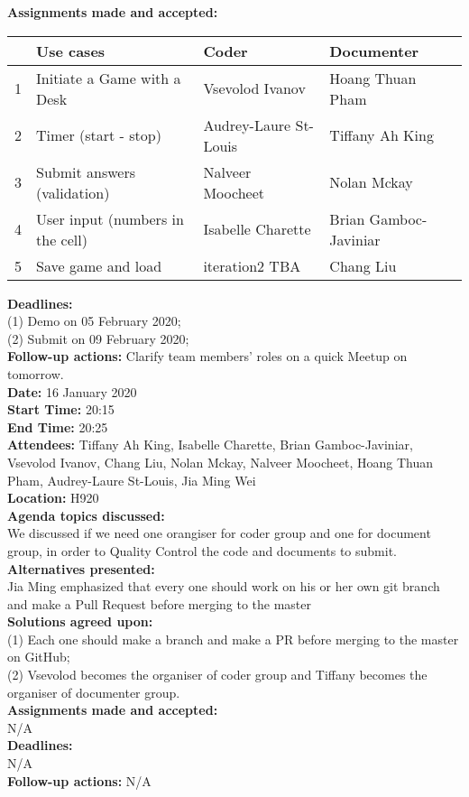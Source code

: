 \documentclass[12pt]{article}
\begin{document}
{\bf Assignments made and accepted:} 
\begin{center}
 \begin{tabular}{||c |l |l |l||} 
 \hline
   & Use cases & Coder & Documenter \\ [0.5ex] 
 \hline\hline
 1 & Initiate a Game with a Desk  & Vsevolod Ivanov & Hoang Thuan Pham \\ 
 \hline
 2 & Timer (start - stop) & Audrey-Laure St-Louis  & Tiffany Ah King \\
 \hline
 3 & Submit answers (validation) & Nalveer Moocheet & Nolan Mckay \\
 \hline
 4 &  User input (numbers in the cell) & Isabelle Charette & Brian Gamboc-Javiniar \\
 \hline
 5 & Save game and load & iteration2 TBA & Chang Liu \\ [1ex] 
 \hline
 \end{tabular}
\end{center}
{\bf Deadlines:} \\(1) Demo on 05 February 2020; \\(2)  Submit on 09 February 2020; \\
{\bf Follow-up actions:} Clarify team members' roles on a quick Meetup on tomorrow.\\

\newpage
{\bf Date:} 16 January 2020\\
{\bf Start Time:} 20:15\\
{\bf End Time:}  20:25\\
{\bf Attendees:} Tiffany Ah King,
Isabelle Charette,
Brian Gamboc-Javiniar,
Vsevolod Ivanov,
Chang Liu,
Nolan Mckay,
Nalveer Moocheet,
Hoang Thuan Pham,
Audrey-Laure St-Louis,
Jia Ming Wei\\
{\bf Location:} H920 \\
{\bf Agenda topics discussed:} \\We discussed if we need one orangiser for coder group and one for document group, in order to Quality Control the code and documents to submit.\\
{\bf Alternatives presented:} \\  Jia Ming emphasized that every one should work on his or her own git branch and make a Pull Request before merging to the master\\
{\bf Solutions agreed upon:} \\(1) Each one should make a branch and make a PR before merging to the master on GitHub; \\(2) Vsevolod becomes the organiser of coder group and Tiffany becomes the organiser of documenter group. \\
{\bf Assignments made and accepted:} \\N/A\\
{\bf Deadlines:} \\ N/A \\
{\bf Follow-up actions:} N/A\\
\end{document}
